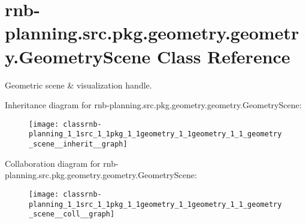 \hypertarget{classrnb-planning_1_1src_1_1pkg_1_1geometry_1_1geometry_1_1_geometry_scene}{}\section{rnb-\/planning.src.\+pkg.\+geometry.\+geometry.\+Geometry\+Scene Class Reference}
\label{classrnb-planning_1_1src_1_1pkg_1_1geometry_1_1geometry_1_1_geometry_scene}


Geometric scene \& visualization handle.  




Inheritance diagram for rnb-\/planning.src.\+pkg.\+geometry.\+geometry.\+Geometry\+Scene\+:\nopagebreak
\begin{figure}[H]
\begin{center}
\leavevmode
\texttt{[image: classrnb-planning\_1\_1src\_1\_1pkg\_1\_1geometry\_1\_1geometry\_1\_1\_geometry\_scene\_\_inherit\_\_graph]}
\end{center}
\end{figure}


Collaboration diagram for rnb-\/planning.src.\+pkg.\+geometry.\+geometry.\+Geometry\+Scene\+:\nopagebreak
\begin{figure}[H]
\begin{center}
\leavevmode
\texttt{[image: classrnb-planning\_1\_1src\_1\_1pkg\_1\_1geometry\_1\_1geometry\_1\_1\_geometry\_scene\_\_coll\_\_graph]}
\end{center}
\end{figure}
